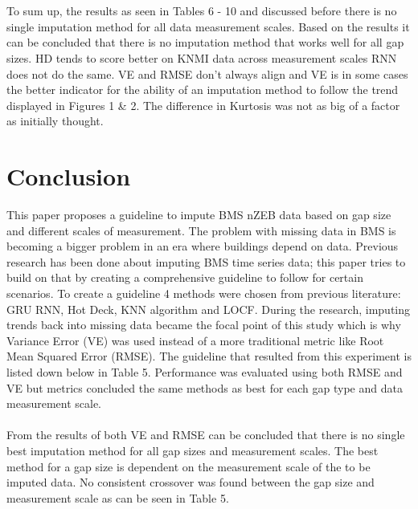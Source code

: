 \documentclass[9.5pt,article,twocolumn]{article}
\begin{document}
\\
\\
To sum up, the results as seen in Tables 6 - 10 and discussed before there is no single imputation method for all data measurement scales. Based on the results it can be concluded that there is no imputation method that works well for all gap sizes. HD tends to score better on KNMI data across measurement scales RNN does not do the same. VE and RMSE don’t always align and VE is in some cases the better indicator for the ability of an imputation method to follow the trend displayed in Figures 1 & 2. The difference in Kurtosis was not as big of a factor as initially thought.


\section{Conclusion}
This paper proposes a guideline to impute BMS nZEB data based on gap size and different scales of measurement. The problem with missing data in BMS is becoming a bigger problem in an era where buildings depend on data. Previous research has been done about imputing BMS time series data; this paper tries to build on that by creating a comprehensive guideline to follow for certain scenarios. To create a guideline 4 methods were chosen from previous literature: GRU RNN, Hot Deck, KNN algorithm and LOCF. During the research, imputing trends back into missing data became the focal point of this study which is why Variance Error (VE) was used instead of a more traditional metric like Root Mean Squared Error (RMSE). The guideline that resulted from this experiment is listed down below in Table 5. Performance was evaluated using both RMSE and VE but metrics concluded the same methods as best for each gap type and data measurement scale. 
\\
\\
From the results of both VE and RMSE can be concluded that there is no single best imputation method for all gap sizes and measurement scales. The best method for a gap size is dependent on the measurement scale of the to be imputed data. No consistent crossover was found between the gap size and measurement scale as can be seen in Table 5.

\\
\end{document}
